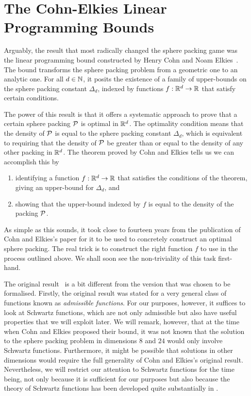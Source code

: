 \section{The Cohn-Elkies Linear Programming Bounds}\label{Ch2:Sec:CohnElkies}

Arguably, the result that most radically changed the sphere packing game was the linear programming bound constructed by Henry Cohn and Noam Elkies~\cite[Theorem 3.1]{CohnElkies}. The bound transforms the sphere packing problem from a geometric one to an analytic one. For all $d \in \mathbb{N}$, it posits the existence of a family of upper-bounds on the sphere packing constant $\Delta_d$, indexed by functions $f : \mathbb{R}^d \to \mathbb{R}$ that satisfy certain conditions.

The power of this result is that it offers a systematic approach to prove that a certain sphere packing $\mathcal{P}$ is optimal in $\mathbb{R}^d$. The optimality condition means that the density of $\mathcal{P}$ is equal to the sphere packing constant $\Delta_d$, which is equivalent to requiring that the density of $\mathcal{P}$ be greater than or equal to the density of any other packing in $\mathbb{R}^d$. The theorem proved by Cohn and Elkies tells us we can accomplish this by
\begin{enumerate}
    \item identifying a function $f : \mathbb{R}^d \to \mathbb{R}$ that satisfies the conditions of the theorem, giving an upper-bound for $\Delta_d$, and
    \item showing that the upper-bound indexed by $f$ is equal to the density of the packing $\mathcal{P}$.
\end{enumerate}
As simple as this sounds, it took close to fourteen years from the publication of Cohn and Elkies's paper for it to be used to concretely construct an optimal sphere packing. The real trick is to construct the right function $f$ to use in the process outlined above. We shall soon see the non-triviality of this task first-hand.

The original result~\cite[Theorem 3.1]{CohnElkies} is a bit different from the version that was chosen to be formalised. Firstly, the original result was stated for a very general class of functions known as \textit{admissible functions}. For our purposes, however, it suffices to look at Schwartz functions, which are not only admissible but also have useful properties that we will exploit later. We will remark, however, that at the time when Cohn and Elkies proposed their bound, it was not known that the solution to the sphere packing problem in dimensions $8$ and $24$ would only involve Schwartz functions. Furthermore, it might be possible that solutions in other dimensions would require the full generality of Cohn and Elkies's original result. Nevertheless, we will restrict our attention to Schwartz functions for the time being, not only because it is sufficient for our purposes but also because the theory of Schwartz functions has been developed quite substantially in \mathlib.

